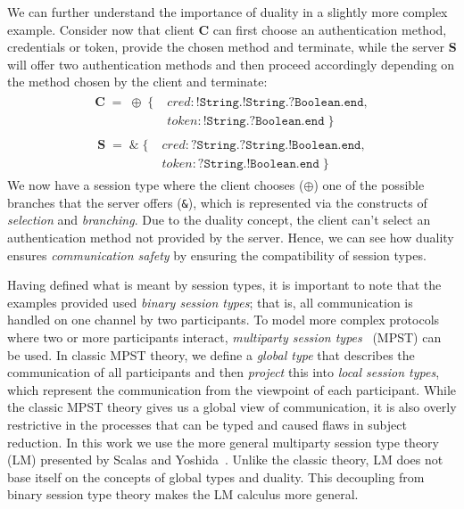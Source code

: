 \documentclass{article}
\newcommand{\type}[1]{\texttt{#1}}
\begin{document}
We can further understand the importance of duality in a slightly more complex example. Consider now that client \textbf{C} can first choose an authentication method, credentials or token, provide the chosen method and terminate, while the server \textbf{S} will offer two authentication methods and then proceed accordingly depending on the method chosen by the client and terminate:
\begin{align*}
    \begin{split}
        \textbf{C} \; = \; \oplus \;\{\; &\textit{cred}: \type{!String.!String.?Boolean.end}, \\ & \textit{token}: \type {!String.?Boolean.end} \;\}\;
    \end{split}
\end{align*}
\begin{align*}
    \begin{split}
       \textbf{S} \; = \; \& \;\{\; &\textit{cred}: \type{?String.?String.!Boolean.end}, \\ & \textit{token}: \type {?String.!Boolean.end} \;\}\;
    \end{split}
\end{align*}
We now have a session type where the client chooses (\type{$\oplus$}) one of the possible branches that the server offers (\type{\&}), which is represented via the constructs of \textit{selection} and \textit{branching}. Due to the duality concept, the client can't select an authentication method not provided by the server. Hence, we can see how duality ensures \textit{communication safety} by ensuring the compatibility of session types.

Having defined what is meant by session types, it is important to note that the examples provided used \textit{binary session types}; that is, all communication is handled on one channel by two participants. 
To model more complex protocols where two or more participants interact, \textit{multiparty session types}~\cite{HYC16} (MPST) can be used. 
In classic MPST theory, we define a \textit{global type} that describes the communication of all participants and then \textit{project} this into \textit{local session types}, which represent the communication from the viewpoint of each participant.
While the classic MPST theory gives us a global view of communication, it is also overly restrictive in the processes that can be typed and caused flaws in subject reduction.
In this work we use the more general multiparty session type theory (LM) presented by Scalas and Yoshida~\cite{SY19}.
Unlike the classic theory, LM does not base itself on the concepts of global types and duality.
This decoupling from binary session type theory makes the LM calculus more general.
\end{document}
